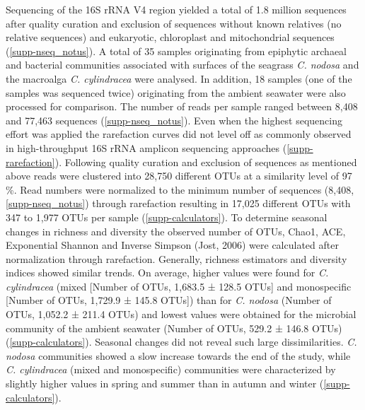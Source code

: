 \documentclass[12pt,]{article}
\begin{document}
Sequencing of the 16S rRNA V4 region yielded a total of 1.8 million
sequences after quality curation and exclusion of sequences without
known relatives (no relative sequences) and eukaryotic, chloroplast and
mitochondrial sequences (\autoref{supp-nseq_notus}). A total of 35
samples originating from epiphytic archaeal and bacterial communities
associated with surfaces of the seagrass \emph{C. nodosa} and the
macroalga \emph{C. cylindracea} were analysed. In addition, 18 samples
(one of the samples was sequenced twice) originating from the ambient
seawater were also processed for comparison. The number of reads per
sample ranged between 8,408 and 77,463 sequences
(\autoref{supp-nseq_notus}). Even when the highest sequencing effort was
applied the rarefaction curves did not level off as commonly observed in
high-throughput 16S rRNA amplicon sequencing approaches
(\autoref{supp-rarefaction}). Following quality curation and exclusion
of sequences as mentioned above reads were clustered into 28,750
different OTUs at a similarity level of 97 \si{\percent}. Read numbers
were normalized to the minimum number of sequences (8,408,
\autoref{supp-nseq_notus}) through rarefaction resulting in 17,025
different OTUs with 347 to 1,977 OTUs per sample
(\autoref{supp-calculators}). To determine seasonal changes in richness
and diversity the observed number of OTUs, Chao1, ACE, Exponential
Shannon and Inverse Simpson (Jost, 2006) were calculated after
normalization through rarefaction. Generally, richness estimators and
diversity indices showed similar trends. On average, higher values were
found for \emph{C. cylindracea} (mixed {[}Number of OTUs, 1,683.5 ±
128.5 OTUs{]} and monospecific {[}Number of OTUs, 1,729.9 ± 145.8
OTUs{]}) than for \emph{C. nodosa} (Number of OTUs, 1,052.2 ± 211.4
OTUs) and lowest values were obtained for the microbial community of the
ambient seawater (Number of OTUs, 529.2 ± 146.8 OTUs)
(\autoref{supp-calculators}). Seasonal changes did not reveal such large
dissimilarities. \emph{C. nodosa} communities showed a slow increase
towards the end of the study, while \emph{C. cylindracea} (mixed and
monospecific) communities were characterized by slightly higher values
in spring and summer than in autumn and winter
(\autoref{supp-calculators}).
\end{document}
